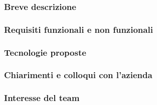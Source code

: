 \documentclass[a4paper,11pt]{article}
\begin{document}
\subsubsection{Breve descrizione}
\subsubsection{Requisiti funzionali e non funzionali}
\subsubsection{Tecnologie proposte}
\subsubsection{Chiarimenti e colloqui con l'azienda}
\subsubsection{Interesse del team}
\end{document}
